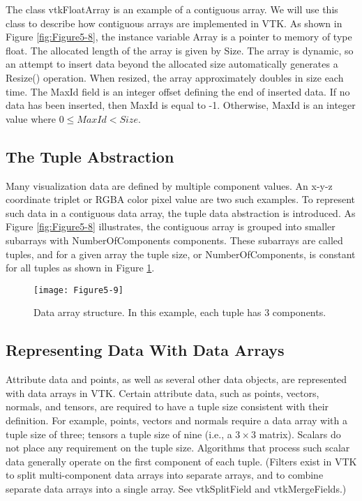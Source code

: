 The class vtkFloatArray is an example of a contiguous array. We will use this class to describe how contiguous arrays are implemented in VTK. As shown in Figure \ref{fig:Figure5-8}, the instance variable Array is a pointer to memory of type float. The allocated length of the array is given by Size. The array is dynamic, so an attempt to insert data beyond the allocated size automatically generates a Resize() operation. When resized, the array approximately doubles in size each time. The MaxId field is an integer offset defining the end of inserted data. If no data has been inserted, then MaxId is equal to -1. Otherwise, MaxId is an integer value where $0 \leq MaxId < Size$.

\subsection{The Tuple Abstraction}

Many visualization data are defined by multiple component values. An x-y-z coordinate triplet or RGBA color pixel value are two such examples. To represent such data in a contiguous data array, the tuple data abstraction is introduced. As Figure \ref{fig:Figure5-8} illustrates, the contiguous array is grouped into smaller subarrays with NumberOfComponents components. These subarrays are called tuples, and for a given array the tuple size, or NumberOfComponents, is constant for all tuples as shown in Figure \ref{fig:Figure5-9}.

\begin{figure}[!htb]
	\centering
	\texttt{[image: Figure5-9]}
	\caption{Data array structure. In this example, each tuple has 3 components.}
	\label{fig:Figure5-9}
\end{figure}

\subsection{Representing Data With Data Arrays}

Attribute data and points, as well as several other data objects, are represented with data arrays in VTK. Certain attribute data, such as points, vectors, normals, and tensors, are required to have a tuple size consistent with their definition. For example, points, vectors and normals require a data array with a tuple size of three; tensors a tuple size of nine (i.e., a $3 \times 3$ matrix). Scalars do not place any requirement on the tuple size. Algorithms that process such scalar data generally operate on the first component of each tuple. (Filters exist in VTK to split multi-component data arrays into separate arrays, and to combine separate data arrays into a single array. See vtkSplitField and vtkMergeFields.)

